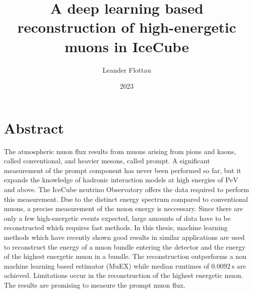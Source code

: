 \documentclass[
  tucolor,       %
  BCOR=12mm,     %
  parskip=half,  %
  open=any,      %
  cleardoublepage=plain,  %
]{tudothesis}
\author{Leander Flottau}
\title{A deep learning based reconstruction of high-energetic muons in IceCube}
\date{2023}
\begin{document}
\frontmatter
\maketitle

\makecorrectorpage
\section*{Abstract}
The atmospheric muon flux results from muons arising from pions and kaons, called conventional, and heavier mesons, called prompt.
A significant measurement of the prompt component has never been performed so far, but it expands the knowledge of hadronic interaction models at high energies of $\si{\peta\electronvolt}$ and above.
The IceCube neutrino Observatory offers the data required to perform this measurement.
Due to the distinct energy spectrum compared to conventional muons, a precise measurement of the muon energy is neccessary. Since there are only a few high-energetic events expected, large amounts of data have to be reconstructed which requires fast methods.
In this thesis, machine learning methods which have recently shown good results in similar applications are used to reconstruct the energy of a muon bundle entering the detector and the energy of the highest energetic muon in a bundle.
The reconstruction outperforms a non machine learning based estimator (MuEX) while median runtimes of $\SI{0.0092}{\second}$ are achieved.
Limitations occur in the reconstruction of the highest energetic muon.
The results are promising to measure the prompt muon flux.
\end{document}
